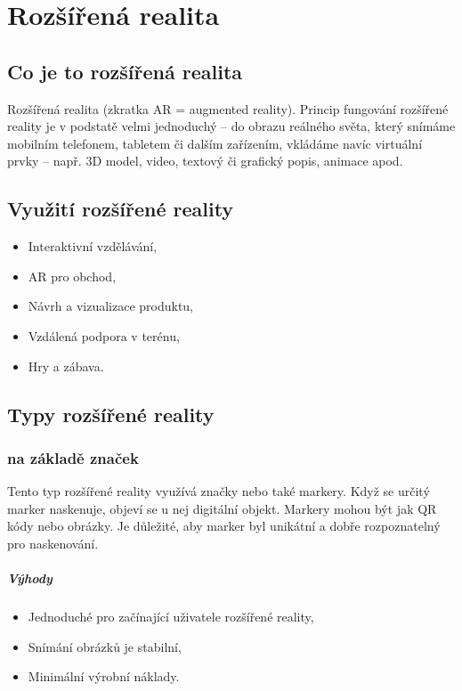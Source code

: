 \documentclass[12pt, a4paper,
twoside,        %
openright
]{report}
\begin{document}
\chapter{Rozšířená realita}

\section{Co je to rozšířená realita}
\label{sec:co_je_AR}
Rozšířená realita (zkratka AR = augmented reality). Princip fungování rozšířené reality je v podstatě velmi jednoduchý – do obrazu reálného světa, který snímáme mobilním telefonem, tabletem či dalším zařízením, vkládáme navíc virtuální prvky – např. 3D model, video, textový či grafický popis, animace apod.


\section{Využití rozšířené reality}
\label{sec:vyuziti_AR}


\begin{itemize}
	\item Interaktivní vzdělávání,
	\item AR pro obchod,
	\item Návrh a vizualizace produktu,
	\item Vzdálená podpora v terénu,
	\item Hry a zábava.
\end{itemize}


\section{Typy rozšířené reality}
\label{sec:typy_AR}


\subsection{na základě značek}
Tento typ rozšířené reality využívá značky nebo také markery. Když se určitý marker naskenuje,
objeví se u nej digitální objekt. Markery mohou být jak QR kódy nebo obrázky. Je důležité, aby
marker byl unikátní a dobře rozpoznatelný pro naskenování. 

\paragraph{Výhody}
\begin{itemize}
	\item Jednoduché pro začínající uživatele rozšířené reality,
	\item Snímání obrázků je stabilní,
	\item Minimální výrobní náklady.
\end{itemize}
\end{document}
